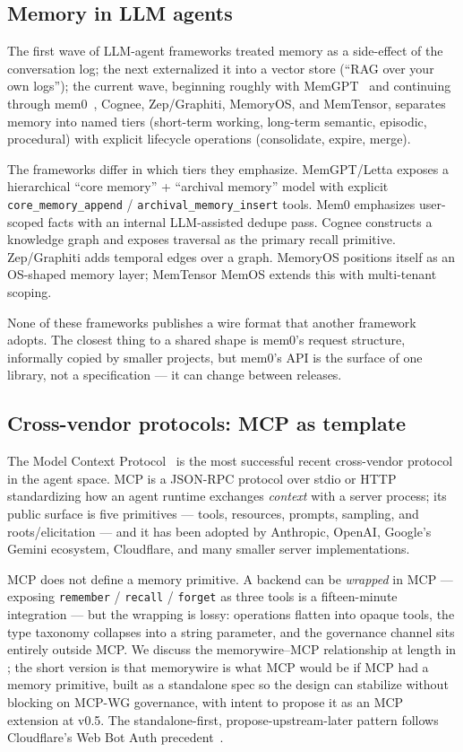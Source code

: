 \documentclass[11pt,letterpaper,twocolumn]{article}
\begin{document}
\subsection{Memory in LLM agents}

The first wave of LLM-agent frameworks treated memory as a side-effect of the conversation log; the next externalized it into a vector store (``RAG over your own logs''); the current wave, beginning roughly with MemGPT~\cite{packer2023memgpt} and continuing through mem0~\cite{chhikara2025mem0}, Cognee, Zep/Graphiti, MemoryOS, and MemTensor, separates memory into named tiers (short-term working, long-term semantic, episodic, procedural) with explicit lifecycle operations (consolidate, expire, merge).

The frameworks differ in which tiers they emphasize. MemGPT/Letta exposes a hierarchical ``core memory'' + ``archival memory'' model with explicit \texttt{core\_memory\_append} / \texttt{archival\_memory\_insert} tools. Mem0 emphasizes user-scoped facts with an internal LLM-assisted dedupe pass. Cognee constructs a knowledge graph and exposes traversal as the primary recall primitive. Zep/Graphiti adds temporal edges over a graph. MemoryOS positions itself as an OS-shaped memory layer; MemTensor MemOS extends this with multi-tenant scoping.

None of these frameworks publishes a wire format that another framework adopts. The closest thing to a shared shape is mem0's request structure, informally copied by smaller projects, but mem0's API is the surface of one library, not a specification --- it can change between releases.

\subsection{Cross-vendor protocols: MCP as template}

The Model Context Protocol~\cite{mcp_spec_2025} is the most successful recent cross-vendor protocol in the agent space. MCP is a JSON-RPC protocol over stdio or HTTP standardizing how an agent runtime exchanges \emph{context} with a server process; its public surface is five primitives --- tools, resources, prompts, sampling, and roots/elicitation --- and it has been adopted by Anthropic, OpenAI, Google's Gemini ecosystem, Cloudflare, and many smaller server implementations.

MCP does not define a memory primitive. A backend can be \emph{wrapped} in MCP --- exposing \texttt{remember} / \texttt{recall} / \texttt{forget} as three tools is a fifteen-minute integration --- but the wrapping is lossy: operations flatten into opaque tools, the type taxonomy collapses into a string parameter, and the governance channel sits entirely outside MCP. We discuss the memorywire--MCP relationship at length in ; the short version is that memorywire is what MCP would be if MCP had a memory primitive, built as a standalone spec so the design can stabilize without blocking on MCP-WG governance, with intent to propose it as an MCP extension at v0.5. The standalone-first, propose-upstream-later pattern follows Cloudflare's Web Bot Auth precedent~\cite{meunier2026webbotauth}.
\end{document}

